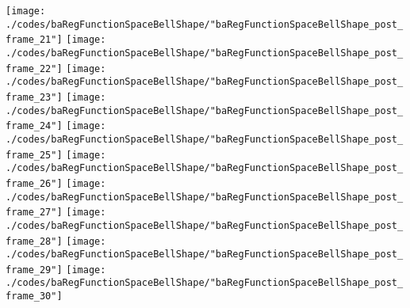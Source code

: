\begin{frame}{\insertsection}
\begin{center}
{\begin{animateinline}{15}
				 \texttt{[image: ./codes/baRegFunctionSpaceBellShape/"baRegFunctionSpaceBellShape\_post\_frame\_21"]}\newframe
				 \texttt{[image: ./codes/baRegFunctionSpaceBellShape/"baRegFunctionSpaceBellShape\_post\_frame\_22"]}\newframe
				 \texttt{[image: ./codes/baRegFunctionSpaceBellShape/"baRegFunctionSpaceBellShape\_post\_frame\_23"]}\newframe
				 \texttt{[image: ./codes/baRegFunctionSpaceBellShape/"baRegFunctionSpaceBellShape\_post\_frame\_24"]}\newframe
				 \texttt{[image: ./codes/baRegFunctionSpaceBellShape/"baRegFunctionSpaceBellShape\_post\_frame\_25"]}\newframe
				 \texttt{[image: ./codes/baRegFunctionSpaceBellShape/"baRegFunctionSpaceBellShape\_post\_frame\_26"]}\newframe
				 \texttt{[image: ./codes/baRegFunctionSpaceBellShape/"baRegFunctionSpaceBellShape\_post\_frame\_27"]}\newframe
				 \texttt{[image: ./codes/baRegFunctionSpaceBellShape/"baRegFunctionSpaceBellShape\_post\_frame\_28"]}\newframe
				 \texttt{[image: ./codes/baRegFunctionSpaceBellShape/"baRegFunctionSpaceBellShape\_post\_frame\_29"]}\newframe
				 \texttt{[image: ./codes/baRegFunctionSpaceBellShape/"baRegFunctionSpaceBellShape\_post\_frame\_30"]}
			 \end{animateinline}
			}
	\end{center}
    
\end{frame}


